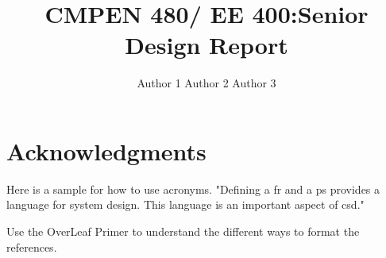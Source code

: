 \documentclass{ipfwpaper}
\author{Author 1\formatemail{Email 1} Author 2\formatemail{Email 2} Author 3\formatemail{Email 3}}
\title{CMPEN 480/ EE 400:Senior Design Report}
\begin{document}
 
\maketitle %




\startTable
{}
\AddRevision{}{}{}
\stopTable


\tableofcontents
\listoftables
\listoffigures
\printglossary[title=List of Acronyms ,type=\acronymtype]
\clearpage



\section*{Acknowledgments}


Here is a sample for how to use acronyms. "Defining a \gls{fr} and a \gls{ps} provides a language for system design. This language is an important aspect of \gls{csd}."






%

%

%
%
%
%

        
%





\clearpage

Use the OverLeaf Primer to understand the different ways to format the references. 
 

\end{document}

